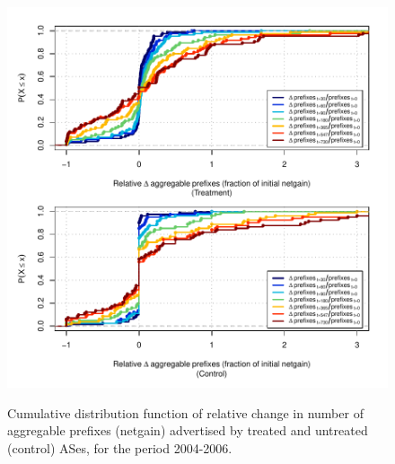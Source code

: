 \clearpage
\vspace*{1.25em}
\begin{figure}[H]
\begin{centering}
\begin{singlespace}
\captionsetup{list=no}
    \includegraphics[width=6in]{figures/behavior-rel_netgain-2004_2006-corr.pdf}
    \vspace{-2em}\\
    \caption{Cumulative distribution function of relative change in number of
    aggregable prefixes (netgain) advertised by treated and untreated (control)
    ASes, for the period 2004-2006.}
\end{singlespace}
\end{centering}
\end{figure}

